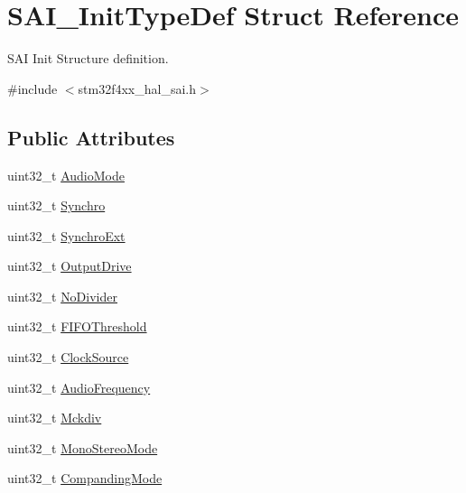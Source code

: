 \hypertarget{struct_s_a_i___init_type_def}{}\section{S\+A\+I\+\_\+\+Init\+Type\+Def Struct Reference}
\label{struct_s_a_i___init_type_def}


S\+AI Init Structure definition.  




{\ttfamily \#include $<$stm32f4xx\+\_\+hal\+\_\+sai.\+h$>$}

\subsection*{Public Attributes}
\begin{DoxyCompactItemize}
\item 
uint32\+\_\+t \hyperlink{struct_s_a_i___init_type_def_a92d4cfb6eef4b7102e77def3ed8453d6}{Audio\+Mode}
\item 
uint32\+\_\+t \hyperlink{struct_s_a_i___init_type_def_aa664510b8555d0702834bc73565a818a}{Synchro}
\item 
uint32\+\_\+t \hyperlink{struct_s_a_i___init_type_def_a70e3a9b25e1d5c969c7c14e678b34b08}{Synchro\+Ext}
\item 
uint32\+\_\+t \hyperlink{struct_s_a_i___init_type_def_a9f8ad868ab366713e8d812b2673dd5f8}{Output\+Drive}
\item 
uint32\+\_\+t \hyperlink{struct_s_a_i___init_type_def_a1f2ec4f0a68f286459be1aa0c20beb55}{No\+Divider}
\item 
uint32\+\_\+t \hyperlink{struct_s_a_i___init_type_def_a7b47337f427e59c2d894937b174d7b06}{F\+I\+F\+O\+Threshold}
\item 
uint32\+\_\+t \hyperlink{struct_s_a_i___init_type_def_a6f85a4b8ed1b1d144525cd502f5fe15e}{Clock\+Source}
\item 
uint32\+\_\+t \hyperlink{struct_s_a_i___init_type_def_a7c9c20beda843b37400a59ade67875b3}{Audio\+Frequency}
\item 
uint32\+\_\+t \hyperlink{struct_s_a_i___init_type_def_a047c3af1ce0bf02723350361c010db26}{Mckdiv}
\item 
uint32\+\_\+t \hyperlink{struct_s_a_i___init_type_def_a69a9d95ec5d511f60e3006bfba486bad}{Mono\+Stereo\+Mode}
\item 
uint32\+\_\+t \hyperlink{struct_s_a_i___init_type_def_ac6534c74273d06309fe2a38d6c791ff1}{Companding\+Mode}
\item 

\end{DoxyCompactItemize}
